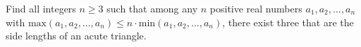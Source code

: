 Find all integers $n \geq 3$ such that among any $n$ positive real numbers $a_1, a_2, \hdots, a_n$ with $\text{max}(a_1,a_2,\hdots,a_n) \leq n \cdot \text{min}(a_1,a_2,\hdots,a_n)$,  there exist three that are the side lengths of an acute triangle.
